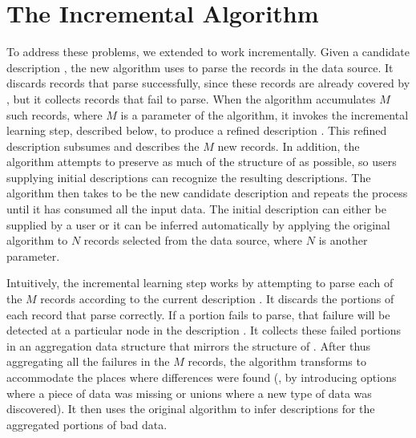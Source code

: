 \section{The Incremental Algorithm}
\label{sec:algo}
To address these problems, we extended \learnpads{} to work incrementally.  
Given a candidate description , the new algorithm uses  to parse
the records in the data source.  
It discards records that parse successfully, since these records are
already covered by , but it collects records that fail to parse.
When the algorithm accumulates $M$ such records, where $M$ is a
parameter of the algorithm, it invokes the incremental learning step,
described below, to produce a refined description .  This refined
description subsumes  and describes the $M$
new records.  In addition, the algorithm attempts to preserve as much
of the structure of  as possible, so users supplying initial
descriptions can recognize the resulting descriptions. 
The algorithm then takes 
to be the new candidate description and repeats the process until it
has consumed all the input data.
The initial description  can either be supplied by a user or it
can be inferred automatically by applying the original algorithm to
$N$ records selected from the data source, where $N$ is another
parameter.  


Intuitively, the incremental learning step works by attempting to
parse each of the $M$ records according to the current description
.  It discards the portions of each record that parse correctly.
If a portion fails to parse, that failure will be detected at a
particular node in the description . It collects these failed
portions in an aggregation data structure  that mirrors the
structure of .  After thus aggregating all the failures in the $M$
records, the algorithm transforms  to accommodate the places where
differences were found (\ie, by introducing options where a piece of
data was missing or unions where a new type of data was discovered).
It then uses the original \learnpads{} algorithm to infer descriptions
for the aggregated portions of bad data. 


